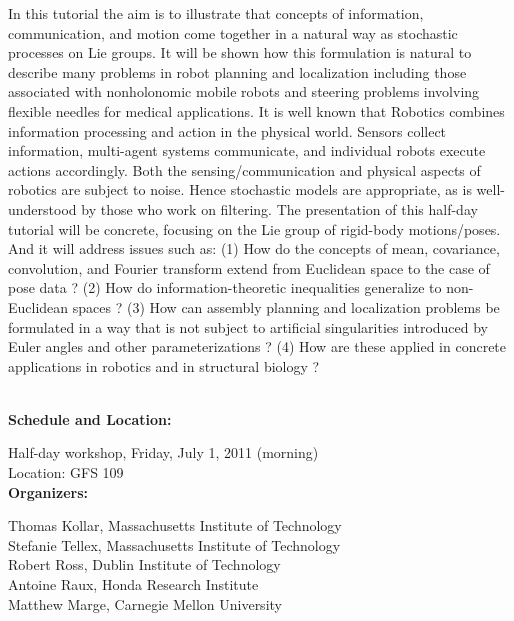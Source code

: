 {In this tutorial the aim is to illustrate that concepts of information, communication, and motion come together in a natural way as stochastic processes on Lie groups. It will be shown how this formulation is natural to describe many problems in robot planning and localization including those associated with nonholonomic mobile robots and steering problems involving flexible needles for medical applications. It is well known that Robotics combines information processing and action in the physical world. Sensors collect information, multi-agent systems communicate, and individual robots execute actions accordingly. Both the sensing/communication and physical aspects of robotics are subject to noise. Hence stochastic models are appropriate, as is well-understood by those who work on filtering. The presentation of this half-day tutorial will be concrete, focusing on the Lie group of rigid-body motions/poses. And it will address issues such as: (1) How do the concepts of mean, covariance, convolution, and Fourier transform extend from Euclidean space to the case of pose data ? (2) How do information-theoretic inequalities generalize to non-Euclidean spaces ? (3) How can assembly planning and localization problems be formulated in a way that is not subject to artificial singularities introduced by Euler angles and other parameterizations ? (4) How are these applied in concrete applications in robotics and in structural biology ?

\\[5mm]

{\bf  Schedule and Location:}

Half-day workshop, Friday, July 1, 2011 (morning)\\
Location: GFS 109 \\[4mm]

{\bf  Organizers:}

Thomas Kollar, Massachusetts Institute of Technology\\
Stefanie Tellex, Massachusetts Institute of Technology\\
Robert Ross, Dublin Institute of Technology\\
Antoine Raux, Honda Research Institute\\
Matthew Marge, Carnegie Mellon University\\[4mm]


}
